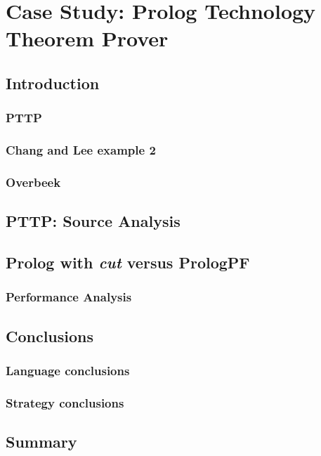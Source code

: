 \chapter{Case Study: Prolog Technology Theorem Prover}
\label{case_pttp}

\section{Introduction}

\subsection{PTTP}

\subsection{Chang and Lee example 2}

\subsection{Overbeek}

\section{PTTP: Source Analysis}

\section{Prolog with \textit{cut} versus PrologPF}

\subsection{Performance Analysis}

\section{Conclusions}

\subsection{Language conclusions}

\subsection{Strategy conclusions}

\section{Summary}

